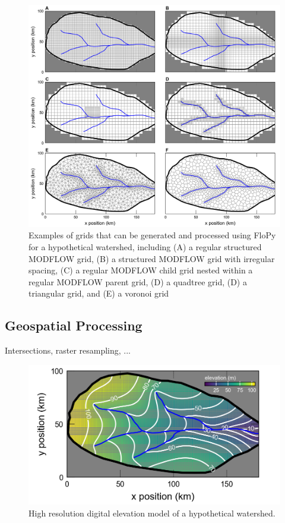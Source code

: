 \documentclass[11pt, oneside]{article}   	%
\begin{document}
\begin{figure}[ht!]
\begin{center}
\includegraphics{figures/grids.png}
\end{center}
\caption{Examples of grids that can be generated and processed using FloPy for a hypothetical watershed, including (A) a regular structured MODFLOW grid, (B) a structured MODFLOW grid with irregular spacing, (C) a regular MODFLOW child grid nested within a regular MODFLOW parent grid, (D) a quadtree grid, (D) a triangular grid, and (E) a voronoi grid}\label{fig:grids}
\end{figure}


\subsection{Geospatial Processing}

Intersections, raster resampling, ...

\begin{figure}[ht!]
	\begin{center}
		\includegraphics{figures/fine_topo.png}
	\end{center}
	\caption{High resolution digital elevation model of a hypothetical watershed.}
	\label{fig:dem}
\end{figure}
\end{document}
